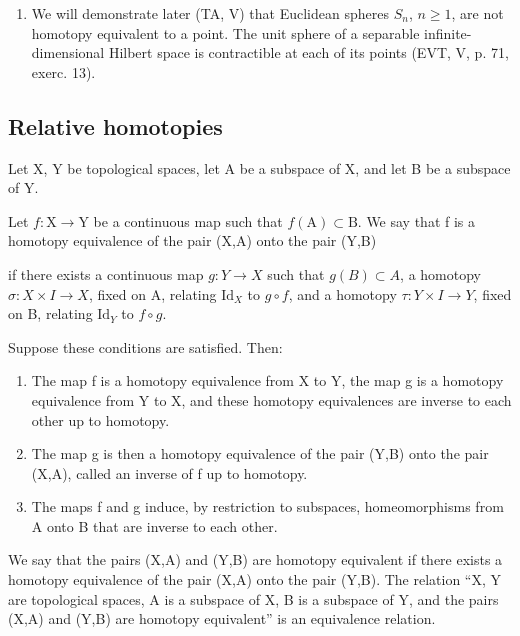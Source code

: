 \begin{enumerate}
\def\labelenumi{\arabic{enumi})}
\setcounter{enumi}{4}
\tightlist
\item
  We will demonstrate later (TA, V) that Euclidean spheres \(S_n\), \(n\geqslant1\), are not homotopy equivalent to a point. The unit sphere of a separable infinite-dimensional Hilbert space is contractible at each of its points (EVT, V, p. 71, exerc. 13).
\end{enumerate}

\subsection{Relative homotopies}

Let X, Y be topological spaces, let A be a subspace of X, and let B be a subspace of Y.

Let \(f:\mathrm{X}\to\mathrm{Y}\) be a continuous map such that \(f(\mathrm{A})\subset\mathrm{B}\). We say that f is a homotopy equivalence of the pair (X,A) onto the pair (Y,B)

if there exists a continuous map \(g\colon Y\to X\) such that \(g(B)\subset A\), a homotopy \(\sigma\colon X\times I\to X\), fixed on A, relating \(\text{Id}_X\) to \(g\circ f\), and a homotopy \(\tau\colon Y\times I\to Y\), fixed on B, relating \(\text{Id}_Y\) to \(f\circ g\).

Suppose these conditions are satisfied. Then:

\begin{enumerate}
\def\labelenumi{\alph{enumi})}
\item
  The map f is a homotopy equivalence from X to Y, the map g is a homotopy equivalence from Y to X, and these homotopy equivalences are inverse to each other up to homotopy.
\item
  The map g is then a homotopy equivalence of the pair (Y,B) onto the pair (X,A), called an inverse of f up to homotopy.
\item
  The maps f and g induce, by restriction to subspaces, homeomorphisms from A onto B that are inverse to each other.
\end{enumerate}

We say that the pairs (X,A) and (Y,B) are homotopy equivalent if there exists a homotopy equivalence of the pair (X,A) onto the pair (Y,B). The relation “X, Y are topological spaces, A is a subspace of X, B is a subspace of Y, and the pairs (X,A) and (Y,B) are homotopy equivalent” is an equivalence relation.


